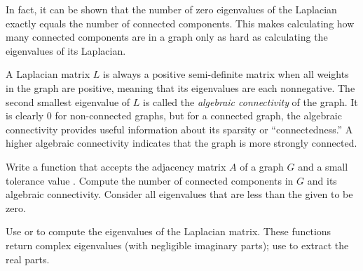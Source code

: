 In fact, it can be shown that the number of zero eigenvalues of the Laplacian exactly equals the number of connected components.
This makes calculating how many connected components are in a graph only as hard as calculating the eigenvalues of its Laplacian.

A Laplacian matrix $L$ is always a positive semi-definite matrix when all weights in the graph are positive, meaning that its eigenvalues are each nonnegative.
The second smallest eigenvalue of $L$ is called the \emph{algebraic connectivity} of the graph.
It is clearly $0$ for non-connected graphs, but for a connected graph, the algebraic connectivity provides useful information about its sparsity or ``connectedness.''
A higher algebraic connectivity indicates that the graph is more strongly connected.

\begin{problem}
Write a function that accepts the adjacency matrix $A$ of a graph $G$ and a small tolerance value .
Compute the number of connected components in $G$ and its algebraic connectivity.
Consider all eigenvalues that are less than the given  to be zero.

Use  or  to compute the eigenvalues of the Laplacian matrix.
These functions return complex eigenvalues (with negligible imaginary parts); use  to extract the real parts.
\end{problem}

